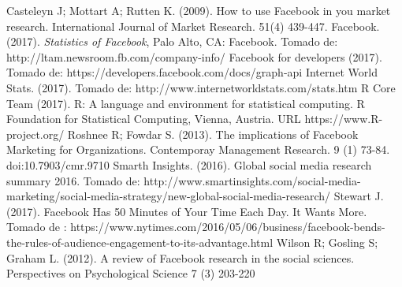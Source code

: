 \documentclass[a4paper,10pt]{article}
\begin{document}
\begin{thebibliography}{20}
   Casteleyn J; Mottart A; Rutten K. (2009). How to use Facebook in you market research. International Journal of Market Research. 51(4) 439-447.
   Facebook. (2017). \textit{ Statistics of  Facebook}, Palo  Alto,  CA:  Facebook. Tomado de: http://ltam.newsroom.fb.com/company-info/
   Facebook for developers (2017). Tomado de: https://developers.facebook.com/docs/graph-api
   Internet World Stats. (2017). Tomado de: http://www.internetworldstats.com/stats.htm
   R Core Team (2017). R: A language and environment for statistical computing. R Foundation for Statistical Computing, Vienna, Austria. URL https://www.R-project.org/
   Roshnee R; Fowdar S. (2013). The implications of Facebook Marketing for Organizations. Contemporay Management Research. 9 (1) 73-84. doi:10.7903/cmr.9710 
   Smarth Insights. (2016). Global social media research summary 2016. Tomado de: http://www.smartinsights.com/social-media-marketing/social-media-strategy/new-global-social-media-research/
   Stewart J. (2017). Facebook Has 50 Minutes of Your Time Each Day. It Wants More. Tomado de : https://www.nytimes.com/2016/05/06/business/facebook-bends-the-rules-of-audience-engagement-to-its-advantage.html
  Wilson R; Gosling S; Graham L. (2012). A review of Facebook research in the social sciences. Perspectives on Psychological Science 7 (3) 203-220
\end{thebibliography}
\end{document}
